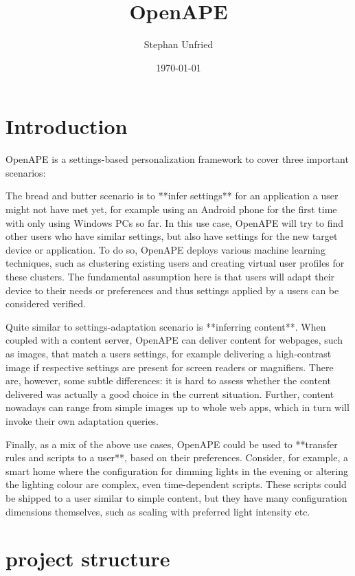 \documentclass[10pt]{article}
\title{OpenAPE}
\author{Stephan Unfried}
\date{\today}
\begin{document}
\maketitle
\newpage
\tableofcontents
\newpage
\section{Introduction}
OpenAPE is a settings-based personalization framework to cover three important scenarios:

The bread and butter scenario is to **infer settings** for an application a user might not have met yet, for example using an Android phone for the first time with only using Windows PCs so far. In this use case, OpenAPE will try to find other users who have similar settings, but also have settings for the new target device or application. To do so, OpenAPE deploys various machine learning techniques, such as clustering existing users and creating virtual user profiles for these clusters. The fundamental assumption here is that users will adapt their device to their needs or preferences and thus settings applied by a users can be considered verified.

Quite similar to settings-adaptation scenario is **inferring content**. When coupled with a content server, OpenAPE can deliver content for webpages, such as images, that match a users settings, for example delivering a high-contrast image if respective settings are present for screen readers or magnifiers. There are, however, some subtle differences: it is hard to assess whether the content delivered was actually a good choice in the current situation. Further, content nowadays can range from simple images up to whole web apps, which in turn will invoke their own adaptation queries.

Finally, as a mix of the above use cases, OpenAPE could be used to **transfer rules and scripts to a user**, based on their preferences. Consider, for example, a smart home where the configuration for dimming lights in the evening or altering the lighting colour are complex, even time-dependent scripts. These scripts could be shipped to a user similar to simple content, but they have many configuration dimensions themselves, such as scaling with preferred light intensity etc.
\section{project structure}
\end{document}
